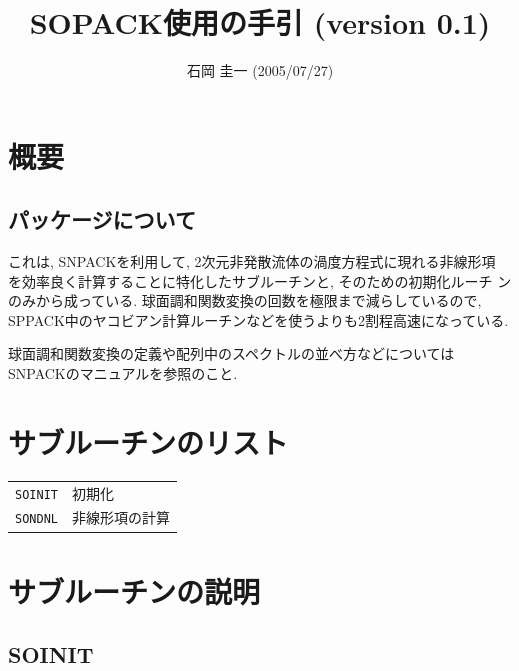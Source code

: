 \documentclass[a4j,fleqn]{jarticle}
\title{SOPACK使用の手引 (version 0.1)}
\author{石岡 圭一  (2005/07/27)}
\date{}
\begin{document}
\maketitle

\section{概要}

\subsection{パッケージについて}

これは, SNPACKを利用して, 2次元非発散流体の渦度方程式に現れる非線形項
を効率良く計算することに特化したサブルーチンと, そのための初期化ルーチ
ンのみから成っている. 球面調和関数変換の回数を極限まで減らしているので,
SPPACK中のヤコビアン計算ルーチンなどを使うよりも2割程高速になっている.

球面調和関数変換の定義や配列中のスペクトルの並べ方などについては
SNPACKのマニュアルを参照のこと.


\section{サブルーチンのリスト}

\vspace{1em}
\begin{tabular}{ll}
{\tt SOINIT} & 初期化\\
{\tt SONDNL} & 非線形項の計算
\end{tabular}


\section{サブルーチンの説明}

\subsection{SOINIT}
\end{document}

